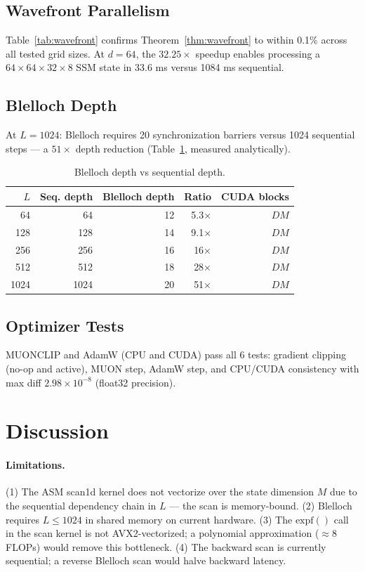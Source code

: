 \documentclass[10pt,twocolumn]{article}
\begin{document}
\subsection{Wavefront Parallelism}
Table~\ref{tab:wavefront} confirms Theorem~\ref{thm:wavefront}
to within 0.1\% across all tested grid sizes.
At $d = 64$, the $32.25\times$ speedup enables processing a
$64 \times 64 \times 32 \times 8$ SSM state in 33.6 ms versus
1084 ms sequential.

\subsection{Blelloch Depth}
At $L = 1024$: Blelloch requires 20 synchronization barriers versus
1024 sequential steps — a $51\times$ depth reduction
(Table~\ref{tab:blelloch}, measured analytically).

\begin{table}[h]
\centering
\caption{Blelloch depth vs sequential depth.}
\label{tab:blelloch}
\begin{tabular}{rrrrr}
\toprule
$L$ & Seq. depth & Blelloch depth & Ratio & CUDA blocks \\
\midrule
  64 & 64 & 12 & 5.3× & $DM$ \\
 128 & 128 & 14 & 9.1× & $DM$ \\
 256 & 256 & 16 & 16× & $DM$ \\
 512 & 512 & 18 & 28× & $DM$ \\
1024 & 1024 & 20 & 51× & $DM$ \\
\bottomrule
\end{tabular}
\end{table}

\subsection{Optimizer Tests}

MUONCLIP and AdamW (CPU and CUDA) pass all 6 tests:
gradient clipping (no-op and active), MUON step, AdamW step,
and CPU/CUDA consistency with max diff $2.98 \times 10^{-8}$ (float32 precision).

\section{Discussion}

\paragraph{Limitations.}
(1) The ASM scan1d kernel does not vectorize over the state dimension $M$
due to the sequential dependency chain in $L$ — the scan is memory-bound.
(2) Blelloch requires $L \leq 1024$ in shared memory on current hardware.
(3) The $\text{expf}()$ call in the scan kernel is not AVX2-vectorized;
a polynomial approximation ($\approx 8$ FLOPs) would remove this bottleneck.
(4) The backward scan is currently sequential; a reverse Blelloch scan
would halve backward latency.
\end{document}
